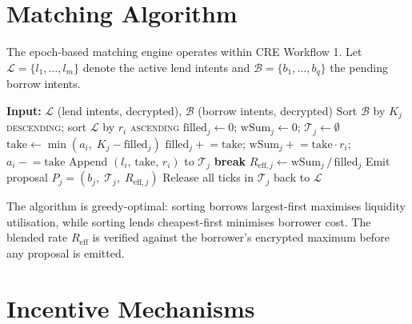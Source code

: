 \documentclass[a4paper,11pt]{article}
\begin{document}
\section{Matching Algorithm}

The epoch-based matching engine operates within CRE Workflow 1. Let
$\mathcal{L} = \{l_1, \ldots, l_m\}$ denote the active lend intents and
$\mathcal{B} = \{b_1, \ldots, b_q\}$ the pending borrow intents.

\begin{algorithm}[H]
\caption{Greedy Tick Matching (within CRE confidential boundary)}
\label{alg:matching}
\begin{algorithmic}[1]
  \State \textbf{Input:} $\mathcal{L}$ (lend intents, decrypted),
         $\mathcal{B}$ (borrow intents, decrypted)
  \State Sort $\mathcal{B}$ by $K_j$ \textsc{descending};
         sort $\mathcal{L}$ by $r_i$ \textsc{ascending}
    \State $\text{filled}_j \gets 0$;\;
           $\text{wSum}_j \gets 0$;\;
           $\mathcal{T}_j \gets \emptyset$
      \State $\mathrm{take} \gets \min(a_i,\; K_j - \text{filled}_j)$
      \State $\text{filled}_j \mathrel{+}= \mathrm{take}$;\quad
             $\text{wSum}_j \mathrel{+}= \mathrm{take} \cdot r_i$;\quad
             $a_i \mathrel{-}= \mathrm{take}$
      \State Append $(l_i,\, \mathrm{take},\, r_i)$ to $\mathcal{T}_j$
       \textbf{break} \EndIf
    \EndFor
    \State $R_{\mathrm{eff},j} \gets \text{wSum}_j \,/\, \text{filled}_j$
      \State Emit proposal $P_j = (b_j,\; \mathcal{T}_j,\;
             R_{\mathrm{eff},j})$
    \Else
      \State Release all ticks in $\mathcal{T}_j$ back to $\mathcal{L}$
    \EndIf
  \EndFor
\end{algorithmic}
\end{algorithm}

The algorithm is greedy-optimal: sorting borrows largest-first maximises
liquidity utilisation, while sorting lends cheapest-first minimises
borrower cost. The blended rate $R_{\mathrm{eff}}$ is verified against the
borrower's encrypted maximum before any proposal is emitted.

\section{Incentive Mechanisms}
\end{document}
